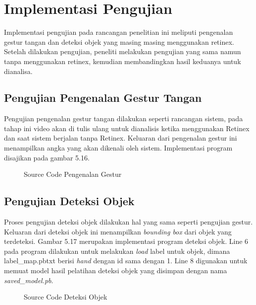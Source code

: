 \section{Implementasi Pengujian}
Implementasi pengujian pada rancangan penelitian ini meliputi pengenalan gestur tangan dan deteksi objek yang masing masing menggunakan retinex. Setelah dilakukan pengujian, peneliti melakukan pengujian yang sama namun tanpa menggunakan retinex, kemudian membandingkan hasil keduanya untuk dianalisa.
\subsection{Pengujian Pengenalan Gestur Tangan}
Pengujian pengenalan gestur tangan dilakukan seperti rancangan sistem, pada tahap ini video akan di tulis ulang untuk dianalisis ketika menggunakan Retinex dan saat sistem berjalan tanpa Retinex. Keluaran dari pengenalan gestur ini menampilkan angka yang akan dikenali oleh sistem. Implementasi program disajikan pada gambar 5.16.
\begin{figure}[H]
	\centering
	
\end{figure}
\begin{figure}[H]
	\centering
	
	\caption{Source Code Pengenalan Gestur}
\end{figure}
\subsection{Pengujian Deteksi Objek}
Proses pengujian deteksi objek dilakukan hal yang sama seperti pengujian gestur. Keluaran dari deteksi objek ini menampilkan \textit{bounding box} dari objek yang terdeteksi. Gambar 5.17 merupakan implementasi program deteksi objek. Line 6 pada program dilakukan untuk melakukan \textit{load} label untuk objek, dimana label\_map.pbtxt berisi \textit{hand} dengan id sama dengan 1. Line 8 digunakan untuk memuat model hasil pelatihan deteksi objek yang disimpan dengan nama \textit{saved\_model.pb}.
\begin{figure}[H]
	\centering
	
\end{figure}
\begin{figure}[H]
	\centering
	
	\caption{Source Code Deteksi Objek}
\end{figure}
